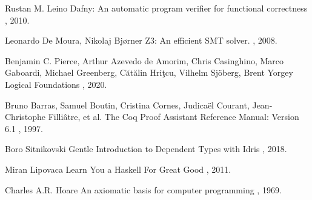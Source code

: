 \documentclass{article}
\begin{document}
\begin{thebibliography}{1}

Rustan M. Leino
\newblock Dafny: An automatic program verifier for functional correctness
, 2010.

Leonardo De Moura, Nikolaj Bjørner
\newblock Z3: An efficient SMT solver.
, 2008.

Benjamin C. Pierce, Arthur Azevedo de Amorim, Chris Casinghino, Marco Gaboardi, Michael Greenberg, Cătălin Hriţcu, Vilhelm Sjöberg, Brent Yorgey
\newblock Logical Foundations
, 2020.

Bruno Barras, Samuel Boutin, Cristina Cornes, Judicaël Courant, Jean-Christophe Filliâtre, et al.
\newblock The Coq Proof Assistant Reference Manual: Version 6.1
, 1997.

Boro Sitnikovski
\newblock Gentle Introduction to Dependent Types with Idris
, 2018.

Miran Lipovaca
\newblock Learn You a Haskell For Great Good
, 2011.

Charles A.R. Hoare
\newblock An axiomatic basis for computer programming
, 1969.

\end{thebibliography}
\end{document}

